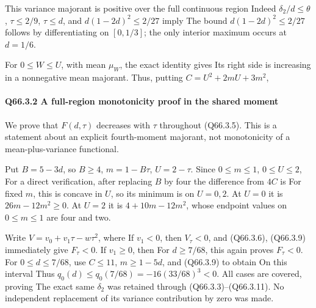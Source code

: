 This variance majorant is positive over the full continuous region
Indeed \(\delta_2/d\le\theta\), \(\tau\le2/9\), \(\tau\le d\), and
\(d(1-2d)^2\le2/27\) imply
The bound \(d(1-2d)^2\le2/27\) follows by differentiating on
\([0,\allowbreak  1/3]\); the only interior maximum occurs at \(d=1/6\).

For \(0\le W\le U\), with mean \(\mu_W\), the exact identity
gives
Its right side is increasing in a nonnegative mean majorant.
Thus, putting \(C=U^2+2mU+3m^2\),

\paragraph{Q66.3.2 A full-region monotonicity proof in the shared moment}

We prove that \(F(d,\allowbreak  \tau)\) decreases with \(\tau\) throughout
(Q66.3.5). This is a statement about an explicit fourth-moment majorant,
not monotonicity of a mean-plus-variance functional.

Put \(B=5-3d\), so \(B\ge4\), \(m=1-B\tau\), \(U=2-\tau\).
Since \(0\le m\le1\), \(0\le U\le2\),
For a direct verification, after replacing \(B\) by four the difference
from \(4C\) is
For fixed \(m\), this is concave in \(U\), so its minimum is on
\(U=0,\allowbreak  2\). At \(U=0\) it is \(26m-12m^2\ge0\).
At \(U=2\) it is \(4+10m-12m^2\), whose endpoint values on
\(0\le m\le1\) are four and two.

Write \(V=v_0+v_1\tau-w\tau^2\), where
If \(v_1<0\), then \(V_\tau<0\), and (Q66.3.6), (Q66.3.9) immediately
give \(F_\tau<0\). If \(v_1\ge0\), then
For \(d\ge7/68\), this again proves \(F_\tau<0\).
For \(0\le d\le7/68\), use \(C\le11\),
\(m\ge1-5d\), and (Q66.3.9) to obtain
On this interval
Thus \(q_0(d)\le q_0(7/68)=-16(33/68)^3<0\).
All cases are covered, proving
The exact same \(\delta_2\) was retained through (Q66.3.3)--(Q66.3.11).
No independent replacement of its variance contribution by zero
was made.

